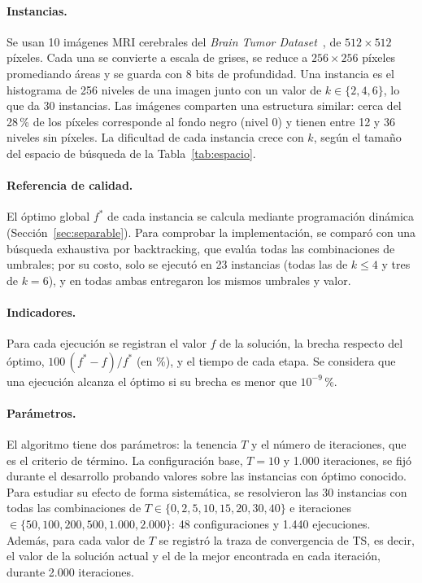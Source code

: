 \documentclass[letter, 10pt]{article}
\begin{document}
\paragraph{Instancias.} Se usan 10 imágenes MRI cerebrales del \textit{Brain Tumor Dataset}~\cite{Cheng2017BrainTumor}, de $512 \times 512$ píxeles. Cada una se convierte a escala de grises, se reduce a $256 \times 256$ píxeles promediando áreas y se guarda con 8 bits de profundidad. Una instancia es el histograma de 256 niveles de una imagen junto con un valor de $k \in \{2, 4, 6\}$, lo que da 30 instancias. Las imágenes comparten una estructura similar: cerca del 28\,\% de los píxeles corresponde al fondo negro (nivel 0) y tienen entre 12 y 36 niveles sin píxeles. La dificultad de cada instancia crece con $k$, según el tamaño del espacio de búsqueda de la Tabla~\ref{tab:espacio}.

\paragraph{Referencia de calidad.} El óptimo global $f^*$ de cada instancia se calcula mediante programación dinámica (Sección~\ref{sec:separable}). Para comprobar la implementación, se comparó con una búsqueda exhaustiva por backtracking, que evalúa todas las combinaciones de umbrales; por su costo, solo se ejecutó en 23 instancias (todas las de $k \leq 4$ y tres de $k = 6$), y en todas ambas entregaron los mismos umbrales y valor.

\paragraph{Indicadores.} Para cada ejecución se registran el valor $f$ de la solución, la brecha respecto del óptimo, $100\,(f^* - f)/f^*$ (en \%), y el tiempo de cada etapa. Se considera que una ejecución alcanza el óptimo si su brecha es menor que $10^{-9}$\,\%.

\paragraph{Parámetros.} El algoritmo tiene dos parámetros: la tenencia $T$ y el número de iteraciones, que es el criterio de término. La configuración base, $T = 10$ y 1.000 iteraciones, se fijó durante el desarrollo probando valores sobre las instancias con óptimo conocido. Para estudiar su efecto de forma sistemática, se resolvieron las 30 instancias con todas las combinaciones de $T \in \{0, 2, 5, 10, 15, 20, 30, 40\}$ e iteraciones $\in \{50, 100, 200, 500, 1.000, 2.000\}$: 48 configuraciones y 1.440 ejecuciones. Además, para cada valor de $T$ se registró la traza de convergencia de TS, es decir, el valor de la solución actual y el de la mejor encontrada en cada iteración, durante 2.000 iteraciones.
\end{document}
